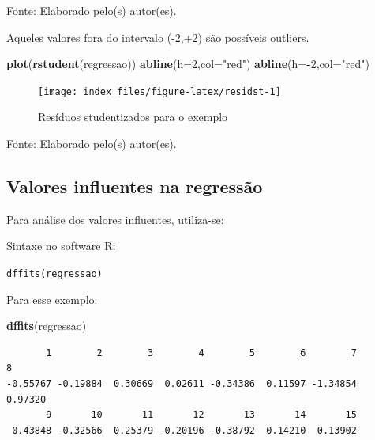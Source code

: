\documentclass[12pt,brazil,oneside]{book}
\newenvironment{Shaded}{\begin{snugshade}}{\end{snugshade}}
\newcommand{\DataTypeTok}[1]{\textcolor[rgb]{0.13,0.29,0.53}{#1}}
\newcommand{\DecValTok}[1]{\textcolor[rgb]{0.00,0.00,0.81}{#1}}
\newcommand{\KeywordTok}[1]{\textcolor[rgb]{0.13,0.29,0.53}{\textbf{#1}}}
\newcommand{\NormalTok}[1]{#1}
\newcommand{\OperatorTok}[1]{\textcolor[rgb]{0.81,0.36,0.00}{\textbf{#1}}}
\newcommand{\StringTok}[1]{\textcolor[rgb]{0.31,0.60,0.02}{#1}}
\begin{document}
Fonte: Elaborado pelo(s) autor(es).

Aqueles valores fora do intervalo (-2,+2) são possíveis outliers.

\begin{Shaded}
\begin{Highlighting}[]
\KeywordTok{plot}\NormalTok{(}\KeywordTok{rstudent}\NormalTok{(regressao)) }
\KeywordTok{abline}\NormalTok{(}\DataTypeTok{h=}\DecValTok{2}\NormalTok{,}\DataTypeTok{col=}\StringTok{"red"}\NormalTok{)}
\KeywordTok{abline}\NormalTok{(}\DataTypeTok{h=}\OperatorTok{-}\DecValTok{2}\NormalTok{,}\DataTypeTok{col=}\StringTok{"red"}\NormalTok{)}
\end{Highlighting}
\end{Shaded}

\begin{figure}[H]

{\centering \texttt{[image: index\_files/figure-latex/residst-1]} 

}

\caption{Resíduos studentizados para o exemplo}\label{fig:residst}
\end{figure}

Fonte: Elaborado pelo(s) autor(es).

\hypertarget{valores-influentes-na-regressao}{%
\subsection{Valores influentes na
regressão}\label{valores-influentes-na-regressao}}

Para análise dos valores influentes, utiliza-se:

Sintaxe no software R:

\texttt{dffits(regressao)}

Para esse exemplo:

\begin{Shaded}
\begin{Highlighting}[]
\KeywordTok{dffits}\NormalTok{(regressao)}
\end{Highlighting}
\end{Shaded}

\begin{verbatim}
       1        2        3        4        5        6        7        8 
-0.55767 -0.19884  0.30669  0.02611 -0.34386  0.11597 -1.34854  0.97320 
       9       10       11       12       13       14       15 
 0.43848 -0.32566  0.25379 -0.20196 -0.38792  0.14210  0.13902 
\end{verbatim}
\end{document}
